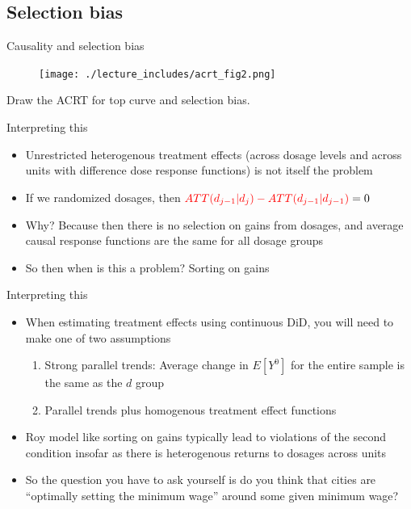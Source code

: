 \documentclass{beamer}
\begin{document}
\subsection{Selection bias}

\begin{frame}{Causality and selection bias}

\begin{figure}
\begin{center}
             \texttt{[image: ./lecture\_includes/acrt\_fig2.png]}
\end{center}
\end{figure}

Draw the ACRT for top curve and selection bias. 

\end{frame}

\begin{frame}{Interpreting this}

\begin{itemize}
\item Unrestricted heterogenous treatment effects (across dosage levels and across units with difference dose response functions) is not itself the problem
\item If we randomized dosages, then $\textcolor{red}{ATT(d_{j-1} | d_j) - ATT(d_{j-1} | d_{j-1})}=0$
\item Why?  Because then there is no selection on gains from dosages, and average causal response functions are the same for all dosage groups
\item So then when is this a problem?  Sorting on gains
\end{itemize}

\end{frame}

\begin{frame}{Interpreting this}

\begin{itemize}

\item When estimating treatment effects using continuous DiD, you will need to make one of two assumptions
	\begin{enumerate}
	\item Strong parallel trends: Average change in $E[Y^0]$ for the entire sample is the same as the $d$ group
	\item Parallel trends plus homogenous treatment effect functions
	\end{enumerate}
\item Roy model like sorting on gains typically lead to violations of the second condition insofar as there is heterogenous returns to dosages across units
\item So the question you have to ask yourself is do you think that cities are ``optimally setting the minimum wage'' around some given minimum wage?
\end{itemize}

\end{frame}
\end{document}
